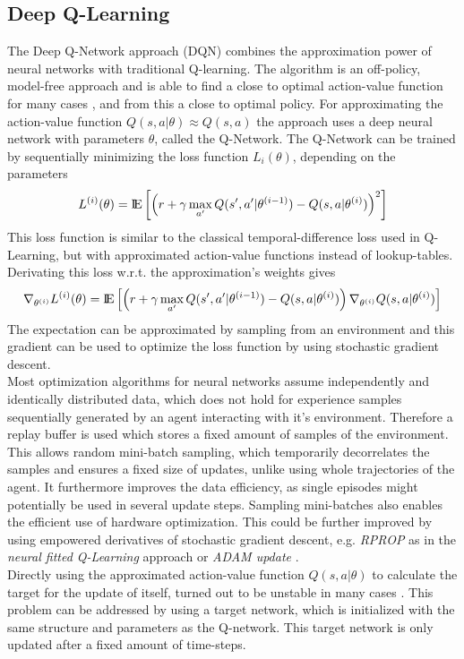 \subsection{Deep Q-Learning}
\label{sec:DQN}
The Deep Q-Network approach (DQN) \citep{mnih2013playing} combines the approximation power of neural networks with traditional Q-learning. The algorithm is an off-policy, model-free approach and is able to find a close to optimal action-value function for many cases \citep{mnih2015human}, and from this a close to optimal policy. For approximating the action-value function $Q(s,a|\theta)\approx Q(s,a)$ the approach uses a deep neural network with parameters $\theta$, called the Q-Network.
The Q-Network can be trained by sequentially minimizing the loss function $L_i(\theta)$, depending on the parameters
\[
L^{(i)}(\theta)={\rm I\!E} \left[\left(r+\gamma \max_{a'} Q(s',a'|\theta^{(i-1)})-Q(s,a|\theta^{(i)})\right)^2\right] 
\]
This loss function is similar to the classical temporal-difference loss used in Q-Learning, but with approximated action-value functions instead of lookup-tables. Derivating this loss w.r.t. the approximation's weights gives
\[
\nabla_{\theta^{(i)}}L^{(i)}(\theta)={\rm I\!E} \left[\left(r+\gamma \max_{a'} Q(s', 
a'|\theta^{(i-1)})-Q(s,a|\theta^{(i)})\right)\nabla_{\theta^{(i)}}Q(s,a|\theta^{(i)})\right] 
\]
The expectation can be approximated by sampling from an environment and this gradient can be used to optimize the loss function by using stochastic gradient descent.\\
Most optimization algorithms for neural networks assume independently and identically distributed data, which does not hold for experience samples sequentially generated by an agent interacting with it's environment. Therefore a replay buffer is used which stores a fixed amount of samples of the environment. This allows random mini-batch sampling, which temporarily decorrelates the samples and ensures a fixed size of updates, unlike using whole trajectories of the agent. It furthermore improves the data efficiency, as single episodes might potentially be used in several update steps. Sampling mini-batches also enables the efficient use of hardware optimization. This could be further improved by using empowered derivatives of stochastic gradient descent, e.g. \textit{RPROP} as in the \textit{neural fitted Q-Learning} approach \citep{riedmiller2005neural} or \textit{ADAM update} \citep{kingma2014adam}.\\
Directly using the approximated action-value function $Q(s,a|\theta)$ to calculate the target for the update of itself, turned out to be unstable in many cases \citep{mnih2015human}. This problem can be addressed by using a target network, which is initialized with the same structure and parameters as the Q-network. This target network is only updated after a fixed amount of time-steps.\\
